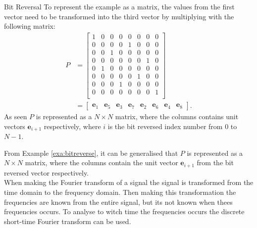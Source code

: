 \begin{example}{Bit Reversal}
    To represent the example as a matrix, the values from the first vector need to be transformed into the third vector by multiplying with the following matrix:
    \begin{align*}
        P&=
        \begin{bmatrix}
            1 & 0 & 0 & 0 & 0 & 0 & 0 & 0\\
            0 & 0 & 0 & 0 & 1 & 0 & 0 & 0\\
            0 & 0 & 1 & 0 & 0 & 0 & 0 & 0\\
            0 & 0 & 0 & 0 & 0 & 0 & 1 & 0\\
            0 & 1 & 0 & 0 & 0 & 0 & 0 & 0\\
            0 & 0 & 0 & 0 & 0 & 1 & 0 & 0\\
            0 & 0 & 0 & 1 & 0 & 0 & 0 & 0\\
            0 & 0 & 0 & 0 & 0 & 0 & 0 & 1\\
        \end{bmatrix}\\
        &=\begin{bmatrix}
        \mathbf{e}_1 & \mathbf{e}_5 & \mathbf{e}_3 & \mathbf{e}_7 & \mathbf{e}_2 & \mathbf{e}_6 & \mathbf{e}_4 & \mathbf{e}_8
        \end{bmatrix}.
 \end{align*}
   As seen $P$ is represented as a $N \times N$ matrix, where the columns contains unit vectors $\mathbf{e}_{i+1}$ respectively, where $i$ is the bit reversed index number from $0$ to $N-1$.
    \label{exa:bitreverse}
\end{example}
From Example \ref{exa:bitreverse}, it can be generalised that $P$ is represented as a $N \times N$ matrix, where the columns contain the unit vector $\mathbf{e}_{i+1}$ from the bit reversed vector respectively. \\

When making the Fourier transform of a signal the signal is transformed from the time domain to the frequency domain. Then making this transformation the frequencies are known from the entire signal, but its not known when thees frequencies occurs. To analyse to witch time the frequencies occurs the discrete short-time Fourier transform can be used. 

